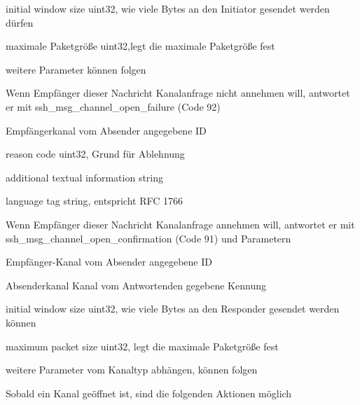 \documentclass[a4paper]{article}
\begin{document}
\begin{multicols}{3}
\begin{itemize*}
\begin{itemize*}
\begin{description*}
                        \item[initial window size] uint32, wie viele Bytes an den Initiator gesendet werden dürfen%
                        \item[maximale Paketgröße] uint32,legt die maximale Paketgröße fest%
                        \item[weitere Parameter] können folgen %
                  \end{description*}
                  \item Wenn Empfänger dieser Nachricht Kanalanfrage nicht annehmen will, antwortet er mit ssh\_msg\_channel\_open\_failure (Code 92)
                  \begin{description*}
                        \item[Empfängerkanal] vom Absender angegebene ID
                        \item[reason code] uint32, Grund für Ablehnung
                        \item[additional textual information] string
                        \item[language tag] string, entspricht RFC 1766
                  \end{description*}
                  \item Wenn Empfänger dieser Nachricht Kanalanfrage annehmen will, antwortet er mit ssh\_msg\_channel\_open\_confirmation (Code 91) und Parametern
                  \begin{description*}
                        \item[Empfänger-Kanal] vom Absender angegebene ID
                        \item[Absenderkanal] Kanal vom Antwortenden gegebene Kennung
                        \item[initial window size] uint32, wie viele Bytes an den Responder gesendet werden können%
                        \item[maximum packet size] uint32, legt die maximale Paketgröße fest%
                        \item[weitere Parameter] vom Kanaltyp abhängen, können folgen
                  \end{description*}
            \end{itemize*}
            \item Sobald ein Kanal geöffnet ist, sind die folgenden Aktionen möglich

\end{itemize*}
\end{multicols}
\end{document}
